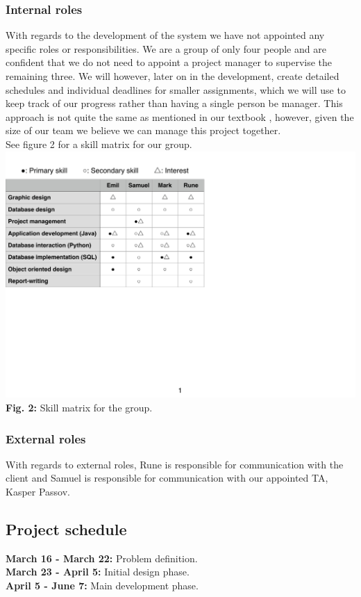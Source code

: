 \documentclass[12pt]{article}
\begin{document}
\subsubsection{Internal roles}
With regards to the development of the system we have not appointed any specific roles or responsibilities. We are a group of only four people and are confident that we do not need to appoint a project manager to supervise the remaining three. We will however, later on in the development, create detailed schedules and individual deadlines for smaller assignments, which we will use to keep track of our progress rather than having a single person be manager. This approach is not quite the same as mentioned in our textbook \cite{OOSE}, however, given the size of our team we believe we can manage this project together.\\
See figure 2 for a skill matrix for our group.\\

\includegraphics[trim=0 64mm 0 0, clip]{skill_matrix}\\
\textbf{Fig. 2:} Skill matrix for the group.\\


\subsubsection{External roles}
With regards to external roles, Rune is responsible for communication with the client and Samuel is responsible for communication with our appointed TA, Kasper Passov.\\



\subsection{Project schedule}
\textbf{March 16 - March 22:} Problem definition.\\
\textbf{March 23 - April 5:} Initial design phase.\\
\textbf{April 5 - June 7:} Main development phase.\\
\end{document}
